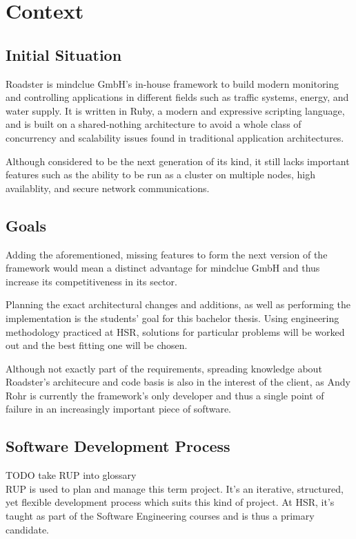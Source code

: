 \chapter{Context}
\section{Initial Situation}
Roadster is mindclue GmbH's in-house framework to build modern monitoring and
controlling applications in different fields such as traffic systems, energy,
and water supply. It is written in Ruby, a modern and expressive scripting
language, and is built on a shared-nothing architecture to avoid a whole class
of concurrency and scalability issues found in traditional application
architectures.

Although considered to be the next generation of its kind, it still lacks
important features such as the ability to be run as a cluster on multiple
nodes, high availablity, and secure network communications.

\section{Goals}
Adding the aforementioned, missing features to form the next version of the
framework would mean a distinct advantage for mindclue GmbH and thus increase
its competitiveness in its sector.

Planning the exact architectural changes and additions, as well as performing
the implementation is the students' goal for this bachelor thesis. Using
engineering methodology practiced at HSR, solutions for particular problems
will be worked out and the best fitting one will be chosen.

Although not exactly part of the requirements, spreading knowledge about Roadster's
architecure and code basis is also in the interest of the client, as Andy Rohr
is currently the framework's only developer and thus a single point of failure
in an increasingly important piece of software.

\section{Software Development Process}
TODO take RUP into glossary\\

RUP is used to plan and manage this term project. It’s an iterative,
structured, yet flexible development process which suits this kind of project.
At HSR, it’s taught as part of the Software Engineering courses and is thus a
primary candidate.


